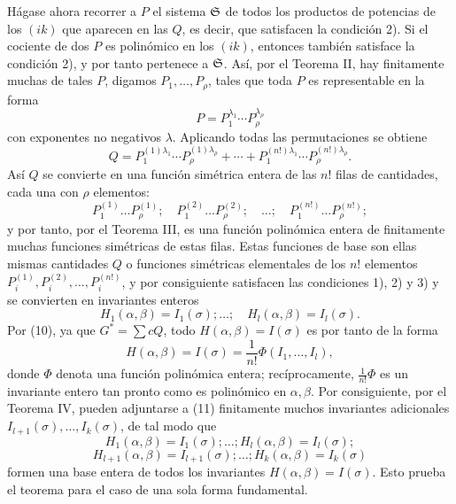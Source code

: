 \documentclass[11pt]{article}
\begin{document}
Hágase ahora recorrer a \(P\) el sistema \(\mathfrak S\) de todos los productos de potencias de los \((ik)\) que aparecen en las \(Q\), es decir, que satisfacen la condición 2). Si el cociente de dos \(P\) es polinómico en los \((ik)\), entonces también satisface la condición 2), y por tanto pertenece a \(\mathfrak S\). Así, por el Teorema II, hay finitamente muchas de tales \(P\), digamos \(P_1,\ldots,P_\rho\), tales que toda \(P\) es representable en la forma
\[
        P=P_1^{\lambda_1}\cdots P_\rho^{\lambda_\rho}
\]
con exponentes no negativos \(\lambda\). Aplicando todas las permutaciones se obtiene
\[
        Q=
        P_1^{(1)\lambda_1}\cdots P_\rho^{(1)\lambda_\rho}
        +\cdots+
        P_1^{(n!)\lambda_1}\cdots P_\rho^{(n!)\lambda_\rho}.
\]
Así \(Q\) se convierte en una función simétrica entera de las \(n!\) filas de cantidades, cada una con \(\rho\) elementos:
\[
        P_1^{(1)}\ldots P_\rho^{(1)};
        \quad
        P_1^{(2)}\ldots P_\rho^{(2)};
        \quad \ldots;\quad
        P_1^{(n!)}\ldots P_\rho^{(n!)};
\]
y por tanto, por el Teorema III, es una función polinómica entera de finitamente muchas funciones simétricas de estas filas. Estas funciones de base son ellas mismas cantidades \(Q\) o funciones simétricas elementales de los \(n!\) elementos \(P_i^{(1)},P_i^{(2)},\ldots,P_i^{(n!)}\), y por consiguiente satisfacen las condiciones 1), 2) y 3) y se convierten en invariantes enteros
\begin{equation}
        H_1(\alpha,\beta)=I_1(\sigma);\ldots;\quad
        H_l(\alpha,\beta)=I_l(\sigma).
\end{equation}
Por (10), ya que \(G^*=\sum cQ\), todo \(H(\alpha,\beta)=I(\sigma)\) es por tanto de la forma
\[
        H(\alpha,\beta)=I(\sigma)=\frac1{n!}\Phi(I_1,\ldots,I_l),
\]
donde \(\Phi\) denota una función polinómica entera; recíprocamente, \(\frac1{n!}\Phi\) es un invariante entero tan pronto como es polinómico en \(\alpha,\beta\). Por consiguiente, por el Teorema IV, pueden adjuntarse a (11) finitamente muchos invariantes adicionales \(I_{l+1}(\sigma),\ldots,I_k(\sigma)\), de tal modo que
\[
        H_1(\alpha,\beta)=I_1(\sigma);\ldots;H_l(\alpha,\beta)=I_l(\sigma);
\]
\[
        H_{l+1}(\alpha,\beta)=I_{l+1}(\sigma);\ldots;H_k(\alpha,\beta)=I_k(\sigma)
\]
formen una base entera de todos los invariantes \(H(\alpha,\beta)=I(\sigma)\). Esto prueba el teorema para el caso de una sola forma fundamental.
\end{document}
